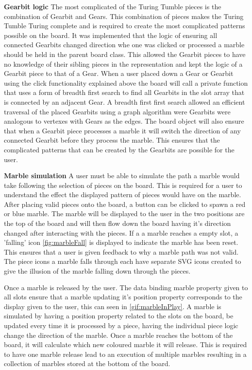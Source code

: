 \documentclass{l4proj}
\begin{document}
\textbf{Gearbit logic}
The most complicated of the Turing Tumble pieces is the combination of Gearbit and Gears. This combination of pieces makes the Turing Tumble Turing complete and is required to create the most complicated patterns possible on the board. It was implemented that the logic of ensuring all connected Gearbits changed direction whe one was clicked or processed a marble should be held in the parent board class. This allowed the Gearbit pieces to have no knowledge of their sibling pieces in the representation and kept the logic of a Gearbit piece to that of a Gear. When a user placed down a Gear or Gearbit using the click functionality explained above the board will call a private function that uses a form of breadth first search to find all Gearbits in the slot array that is connected by an adjacent Gear. A breadth first first search allowed an efficient traversal of the placed Gearbits using a graph algorithm were Gearbits were analogous to vertexes with Gears as the edges. The board object will also ensure that when a Gearbit piece processes a marble it will switch the direction of any connected Gearbit before they process the marble. This ensures that the complicated patterns that can be created by the Gearbits are possible for the user.

\textbf{Marble simulation}
A user must be able to simulate the path a marble would take following the selection of pieces on the board. This is required for a user to understand the effect the displayed pattern of pieces would have on the marble. After placing valid pieces onto the board, a button can be clicked to spawn a red or blue marble. The marble will be displayed to the user in the two positions are the top of the board and will then flow down the board having it's direction changed after interacting with the pieces. If a a marble reaches a empty slot, a 'falling' icon \ref{fig:marbleFall} is displayed to indicate the marble has been reset. This ensures that a user is given feedback to why a marble path was not valid. The piece icons a marble falls through each have separate SVG icons created to give the illusion of the marble falling down through the pieces.

Once a marble is released by the user. The data binding marble property given to all slots ensure that a marble updating it's position property corresponds to the display given to the user, this can seen in \ref{gif:marbleInPlay}. A marble is simulated by having a position property related to the slots on the board, be updated every time it is processed by a piece, having the individual piece logic change the direction of the marble. Once a marble reaches the bottom of the board, it will calculate which new coloured marble it will release. This is required to have one marble release lead to an execution of multiple marbles resulting in a collection of marbles stored at the bottom of the board. 
\end{document}

